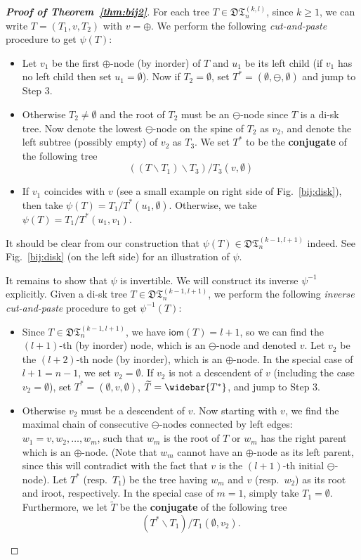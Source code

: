 \documentclass[12pt]{amsart}
\numberwithin{equation}{section}
\theoremstyle{plain}
\theoremstyle{definition}
\newcommand{\DT}{\mathfrak{DT}}
\def\iom{\mathsf{iom}}
\begin{document}
\begin{proof}[{\bf Proof of Theorem~\ref{thm:bij2}}]
For each tree $T\in\DT_n^{(k,l)}$, since $k\geq1$, we can write $T=(T_1,v,T_2)$ with $v=\oplus$. We perform the following {\em cut-and-paste} procedure to get $\psi(T)$: 
\begin{itemize}
\item[Step 1] Let $v_1$ be the first $\oplus$-node (by inorder) of $T$ and $u_1$ be its left child (if $v_1$ has no left child then set $u_1=\emptyset$). Now if $T_2=\emptyset$, set $T^*=(\emptyset,\ominus,\emptyset)$ and jump to Step 3.

\item[Step 2] Otherwise $T_2\neq\emptyset$ and the root of $T_2$ must be an $\ominus$-node since $T$ is a di-sk tree. Now denote the lowest $\ominus$-node on the spine of $T_2$ as $v_2$, and denote the left subtree (possibly empty) of $v_2$ as $T_3$. We set $T^*$ to be the {\bf conjugate} of the following tree
$$((T\backslash T_1)\backslash T_3)/T_3(v,\emptyset)$$
 

\item[Step 3] If $v_1$ coincides with $v$ (see a small example on right side of Fig.~\ref{bij:disk}), then take $\psi(T)=T_1/T^*(u_1,\emptyset)$. Otherwise, we take $\psi(T)=T_1/T^*(u_1,v_1)$.

\end{itemize}
It should be clear from our construction that $\psi(T)\in\DT_n^{(k-1,l+1)}$ indeed. See Fig.~\ref{bij:disk}  (on the left side) for an illustration of $\psi$. 

It remains to show that $\psi$ is invertible. We will construct its inverse $\psi^{-1}$ explicitly. Given a di-sk tree $T\in\DT_n^{(k-1,l+1)}$, we perform the following {\em inverse  cut-and-paste} procedure to get $\psi^{-1}(T)$: 
\begin{itemize}
\item[Step 1] 
Since $T\in\DT_n^{(k-1,l+1)}$, we have $\iom(T)=l+1$, so we can find the $(l+1)$-th (by inorder) node, which is an $\ominus$-node and denoted $v$. Let $v_2$ be the $(l+2)$-th node (by inorder), which is an $\oplus$-node. In the special case of $l+1=n-1$, we set $v_2=\emptyset$. If $v_2$ is not a descendent of $v$ (including the case $v_2=\emptyset$), set $T^*=(\emptyset,v,\emptyset)$, $\widetilde{T}=\widebar{T^*}$, and jump to Step 3.
\item[Step 2] 
Otherwise $v_2$ must be a descendent of $v$. Now starting with $v$, we find the maximal chain of consecutive $\ominus$-nodes connected by left edges: $w_1=v, w_2,\ldots,w_m$, such that $w_m$ is the root of $T$ or $w_m$ has the right parent which is an $\oplus$-node. (Note that $w_m$ cannot have an $\oplus$-node as its left parent, since this will contradict with the fact that $v$ is the $(l+1)$-th initial $\ominus$-node). Let $T^*$ (resp.~$T_1$) be the tree having $w_m$ and $v$ (resp.~$w_2$) as its root and iroot, respectively. In the special case of $m=1$, simply take $T_1=\emptyset$. Furthermore, we let $\widetilde{T}$ be the {\bf conjugate} of the following tree
$$(T^*\backslash T_1)/T_1(\emptyset,v_2).$$



\end{itemize}
\end{proof}
\end{document}
